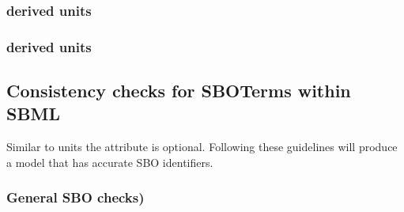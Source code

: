 \begin{sbmlenum}

\end{sbmlenum} \subsubsection*{ derived units} \begin{sbmlenum}


\end{sbmlenum} \subsubsection*{ derived units} \begin{sbmlenum}


\end{sbmlenum}

\subsection{Consistency checks for SBOTerms within SBML}

Similar to units the  attribute is optional.  Following these
guidelines will produce a model that has accurate SBO identifiers.

\subsubsection*{General SBO checks)} \begin{sbmlenum}


\end{sbmlenum}